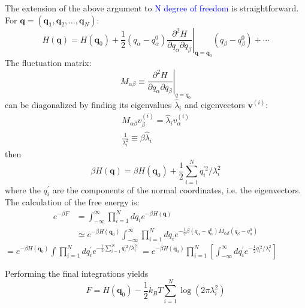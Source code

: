 \documentclass[12pt,titlepage]{article}
\newcommand{\bluep}[1]{\textcolor{blue}{#1}}
\numberwithin{equation}{section}
\begin{document}
The extension of the above argument to \bluep{N degree of freedom} is straightforward. For $\mathbf{q}=\left(\boldsymbol{q}_{\mathbf{1}}, \boldsymbol{q}_{2}, \ldots, \boldsymbol{q}_{N}\right)$:
\begin{equation}
H(\mathbf{q})=H\left(\mathbf{q}_{0}\right)+\left.\frac{1}{2}\left(q_{\alpha}-q_{\alpha}^{0}\right) \frac{\partial^{2} H}{\partial q_{\alpha} \partial q_{\beta}}\right|_{\mathbf{q}=\mathbf{q}_{0}}\left(q_{\beta}-q_{\beta}^{0}\right)+\cdots
\end{equation}
The fluctuation matrix:
\begin{equation}
\left.M_{\alpha \beta} \equiv \frac{\partial^{2} H}{\partial q_{\alpha} \partial q_{\beta}}\right|_{q=q_{0}}
\end{equation}
can be diagonalized by finding its eigenvalues $\hat{\lambda}_{i}$ and eigenvectors $\mathbf{v}^{(i)}$:
\begin{equation}
\begin{array}{c}{M_{\alpha \beta} v_{\beta}^{(i)}=\hat{\lambda}_{i} v_{\alpha}^{(i)}} \\ {\frac{1}{\lambda_{i}^{2}} \equiv \beta \hat{\lambda}_{i}}\end{array}
\end{equation}
then
\begin{equation}
\beta H(\mathbf{q})=\beta H\left(\mathbf{q}_{0}\right)+\frac{1}{2} \sum_{i=1}^{N} q_{i}^{\prime 2} / \lambda_{i}^{2}
\end{equation}
where the $q_i^{\prime}$ are the components of the normal coordinates, i.e. the eigenvectors. The calculation of the free energy is:
\begin{equation}
\begin{aligned} e^{-\beta F} &=\int_{-\infty}^{\infty} \prod_{i=1}^{N} d q_{i} e^{-\beta H(\mathbf{q})} \\ & \simeq e^{-\beta H\left(\mathbf{q}_{0}\right)} \int_{-\infty}^{\infty} \prod_{i=1}^{N} d q_{i} e^{-\frac{1}{2} \beta\left(q_{\alpha}-q_{\alpha}^{0}\right) M_{\alpha \beta}\left(q_{\beta}-q_{\alpha}^{0}\right)}  \end{aligned}
\end{equation}
$=e^{-\beta H\left(\mathbf{q}_{0}\right)} \int \prod_{i=1}^{N} d q_{i}^{\prime} e^{-\frac{1}{2} \sum_{i=1}^{N} q_{i}^{\prime 2} / \lambda_{i}^{2}}$
$=e^{-\beta H\left(\mathbf{q}_{0}\right)} \prod_{i=1}^{N}\left[\int_{-\infty}^{\infty} d q_{i}^{\prime} e^{-\frac{1}{2} q_{i}^{\prime 2} / \lambda_{i}^{2}}\right]$

Performing the final integrations yields
\begin{equation}
F=H\left(\mathbf{q}_{0}\right)-\frac{1}{2} k_{B} T \sum_{i=1}^{N} \log \left(2 \pi \lambda_{i}^{2}\right)
\end{equation}
\end{document}
